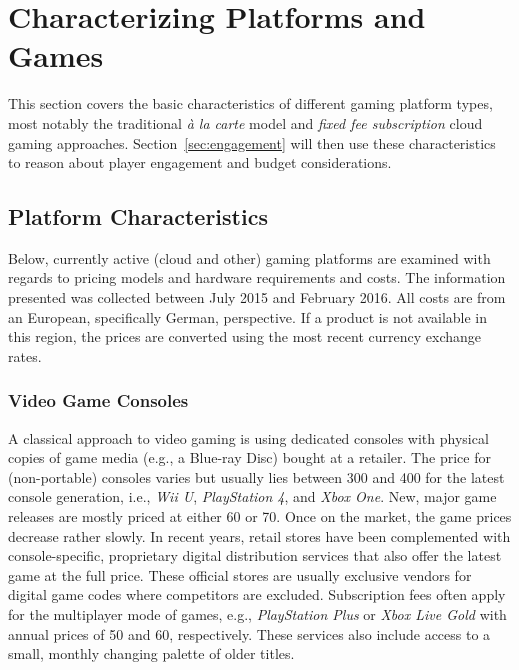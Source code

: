 \section{Characterizing Platforms and Games}
\label{sec:background}

This section covers the basic characteristics of different gaming platform types, most notably the traditional  \textit{à la carte} model and \textit{fixed fee subscription} cloud gaming approaches. Section~\ref{sec:engagement} will then use these characteristics to reason about player engagement and budget considerations.

\subsection{Platform Characteristics}\label{subsec:platform-characteristics}

Below, currently active (cloud and other) gaming platforms are examined with regards to pricing models and hardware requirements and costs. The information presented was collected between July 2015 and February 2016. All costs are from an European, specifically German, perspective. If a product is not available in this region, the prices are converted using the most recent currency exchange rates.

\subsubsection{Video Game Consoles}

A classical approach to video gaming is using dedicated consoles with physical copies of game media (e.g., a Blue-ray Disc) bought at a retailer. The price for (non-portable) consoles varies but usually lies between \SI{300}[\EUR]{} and \SI{400}[\EUR]{} for the latest console generation, i.e., \textit{Wii U}, \textit{PlayStation 4}, and \textit{Xbox One}. New, major game releases are mostly priced at either \SI{60}[\EUR]{} or \SI{70}[\EUR]{}. Once on the market, the game prices decrease rather slowly. In recent years, retail stores have been complemented with console-specific, proprietary digital distribution services that also offer the latest game at the full price. These official stores are usually exclusive vendors for digital game codes where competitors are excluded.
Subscription fees often apply for the multiplayer mode of games, e.g., \textit{PlayStation Plus} or \textit{Xbox Live Gold} with annual prices of \SI{50}[\EUR]{} and \SI{60}[\EUR]{}, respectively. These services also include access to a small, monthly changing palette of older titles.


